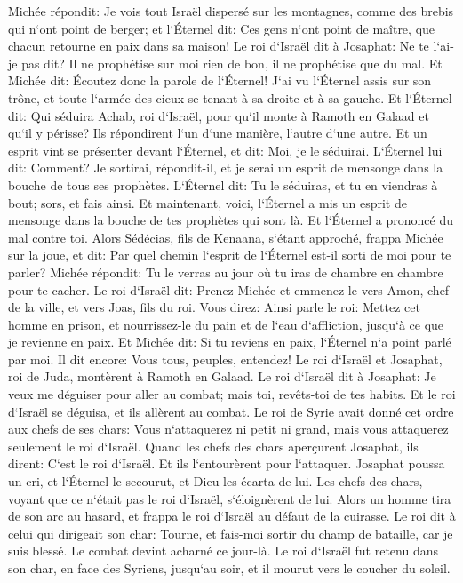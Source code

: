 \verse Michée répondit: Je vois tout Israël dispersé sur les montagnes, comme des brebis qui n`ont point de berger; et l`Éternel dit: Ces gens n`ont point de maître, que chacun retourne en paix dans sa maison! 
\verse Le roi d`Israël dit à Josaphat: Ne te l`ai-je pas dit? Il ne prophétise sur moi rien de bon, il ne prophétise que du mal. 
\verse Et Michée dit: Écoutez donc la parole de l`Éternel! J`ai vu l`Éternel assis sur son trône, et toute l`armée des cieux se tenant à sa droite et à sa gauche. 
\verse Et l`Éternel dit: Qui séduira Achab, roi d`Israël, pour qu`il monte à Ramoth en Galaad et qu`il y périsse? Ils répondirent l`un d`une manière, l`autre d`une autre. 
\verse Et un esprit vint se présenter devant l`Éternel, et dit: Moi, je le séduirai. 
\verse L`Éternel lui dit: Comment? Je sortirai, répondit-il, et je serai un esprit de mensonge dans la bouche de tous ses prophètes. L`Éternel dit: Tu le séduiras, et tu en viendras à bout; sors, et fais ainsi. 
\verse Et maintenant, voici, l`Éternel a mis un esprit de mensonge dans la bouche de tes prophètes qui sont là. Et l`Éternel a prononcé du mal contre toi. 
\verse Alors Sédécias, fils de Kenaana, s`étant approché, frappa Michée sur la joue, et dit: Par quel chemin l`esprit de l`Éternel est-il sorti de moi pour te parler? 
\verse Michée répondit: Tu le verras au jour où tu iras de chambre en chambre pour te cacher. 
\verse Le roi d`Israël dit: Prenez Michée et emmenez-le vers Amon, chef de la ville, et vers Joas, fils du roi. 
\verse Vous direz: Ainsi parle le roi: Mettez cet homme en prison, et nourrissez-le du pain et de l`eau d`affliction, jusqu`à ce que je revienne en paix. 
\verse Et Michée dit: Si tu reviens en paix, l`Éternel n`a point parlé par moi. Il dit encore: Vous tous, peuples, entendez! 
\verse Le roi d`Israël et Josaphat, roi de Juda, montèrent à Ramoth en Galaad. 
\verse Le roi d`Israël dit à Josaphat: Je veux me déguiser pour aller au combat; mais toi, revêts-toi de tes habits. Et le roi d`Israël se déguisa, et ils allèrent au combat. 
\verse Le roi de Syrie avait donné cet ordre aux chefs de ses chars: Vous n`attaquerez ni petit ni grand, mais vous attaquerez seulement le roi d`Israël. 
\verse Quand les chefs des chars aperçurent Josaphat, ils dirent: C`est le roi d`Israël. Et ils l`entourèrent pour l`attaquer. Josaphat poussa un cri, et l`Éternel le secourut, et Dieu les écarta de lui. 
\verse Les chefs des chars, voyant que ce n`était pas le roi d`Israël, s`éloignèrent de lui. 
\verse Alors un homme tira de son arc au hasard, et frappa le roi d`Israël au défaut de la cuirasse. Le roi dit à celui qui dirigeait son char: Tourne, et fais-moi sortir du champ de bataille, car je suis blessé. 
\verse Le combat devint acharné ce jour-là. Le roi d`Israël fut retenu dans son char, en face des Syriens, jusqu`au soir, et il mourut vers le coucher du soleil. 

